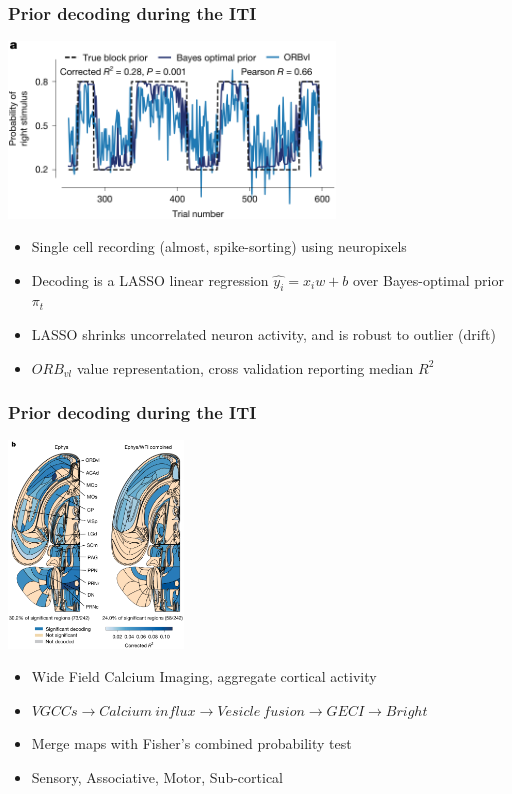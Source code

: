 \documentclass{beamer}
\begin{document}
\begin{frame}
  \frametitle{Prior decoding during the ITI}
  \begin{center}
    \includegraphics[width=0.65\textwidth, keepaspectratio]{./figure2a}
  \end{center}
  \begin{itemize}
      \small
    \item Single cell recording (almost, spike-sorting) using neuropixels
    \item Decoding is a LASSO linear regression $\hat{y_{i}} = x_{i}w+b$ over Bayes-optimal prior $\pi_{t}$
    \item LASSO shrinks uncorrelated neuron activity, and is robust to outlier (drift)
    \item $ORB_{vl}$ value representation, cross validation reporting median $R^{2}$
  \end{itemize}
\end{frame}

\begin{frame}
  \frametitle{Prior decoding during the ITI}
  \begin{center}
    \includegraphics[width=0.35\textwidth, keepaspectratio]{./figure2b}
  \end{center}
  \begin{itemize}
    \item Wide Field Calcium Imaging, aggregate cortical activity
    \item $VGCCs \rightarrow Calcium \ influx \rightarrow Vesicle \ fusion \rightarrow GECI \rightarrow Bright$
    \item Merge maps with Fisher's combined probability test
    \item Sensory, Associative, Motor, Sub-cortical
  \end{itemize}
\end{frame}
\end{document}
